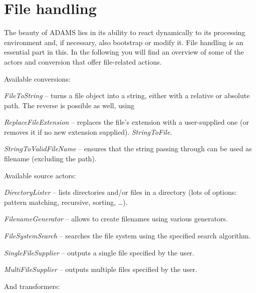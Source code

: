 \newpage
\section{File handling}
\label{file_handling}
The beauty of ADAMS lies in its ability to react dynamically to its processing
environment and, if necessary, also bootstrap or modify it. File handling is an
essential part in this. In the following you will find an overview of some of
the actors and conversion that offer file-related actions.

Available conversions:
\begin{tight_itemize}
	\item \textit{FileToString} -- turns a file object into a string, either with a 
	relative or absolute path. The reverse is possible as well, using
	\item \textit{ReplaceFileExtension} -- replaces the file's extension with
	a user-supplied one (or removes it if no new extension supplied).
	\textit{StringToFile}.
	\item \textit{StringToValidFileName} -- ensures that the string passing through can 
	be used as filename (excluding the path).
\end{tight_itemize}
Available source actors:
\begin{tight_itemize}
	\item \textit{DirectoryLister} -- lists directories and/or files in a
	directory (lots of options: pattern matching, recursive, sorting, \ldots).
	\item \textit{FilenameGenerator} -- allows to create filenames using various
	generators.
	\item \textit{FileSystemSearch} -- searches the file system using the
	specified search algorithm.
	\item \textit{SingleFileSupplier} -- outputs a single file specified by the
	user.
	\item \textit{MultiFileSupplier} -- outputs multiple files specified by the
	user.
\end{tight_itemize}
And transformers:
